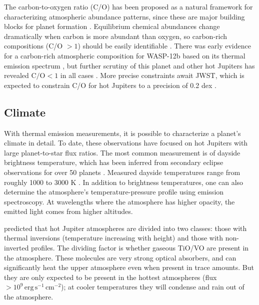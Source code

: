 \documentclass[graybox,natbib,nosecnum]{svmult}
\begin{document}
The carbon-to-oxygen ratio (C/O) has been proposed as a natural framework for characterizing atmospheric abundance patterns, since these are major building blocks for planet formation \citep{madhusudhan12}.  Equilibrium chemical abundances change dramatically when carbon is more abundant than oxygen, so carbon-rich compositions (C/O $> 1$) should be easily identifiable \citep{moses13}.  There was early evidence for a carbon-rich atmospheric composition for WASP-12b based on its thermal emission spectrum \citep{madhusudhan11}, but further scrutiny of this planet and other hot Jupiters has revealed $\mathrm{C/O} < 1$ in all cases \citep{line14, kreidberg15b, benneke15, barstow17}. More precise constraints await JWST, which is expected to constrain C/O for hot Jupiters to a precision of 0.2 dex \citep{greene16}.

\subsection{Climate}
With thermal emission measurements, it is possible to characterize a planet's climate in detail.  To date, these observations have focused on hot Jupiters with large planet-to-star flux ratios. The most common measurement is of dayside brightness temperature, which has been inferred from secondary eclipse observations for over 50 planets \citep{schwartz15}. Measured dayside temperatures range from roughly 1000 to 3000 K \citep{stevenson14b, kammer15, morley17}.  In addition to brightness temperatures, one can also determine the atmosphere's temperature-pressure profile using emission spectroscopy. At wavelengths where the atmosphere has higher opacity, the emitted light comes from higher altitudes. 

\cite{fortney08} predicted that hot Jupiter atmospheres are divided into two classes: those with thermal inversions (temperature increasing with height) and those with non-inverted profiles. The dividing factor is whether gaseous TiO/VO are present in the atmosphere. These molecules are very strong optical absorbers, and can significantly heat the upper atmosphere even when present in trace amounts. But they are only expected to be present in the hottest atmospheres (flux $>10^9\,\mathrm{erg}\,\mathrm{s}^{-1}\,\mathrm{cm}^{-2}$); at cooler temperatures they will condense and rain out of the atmosphere.
\end{document}
